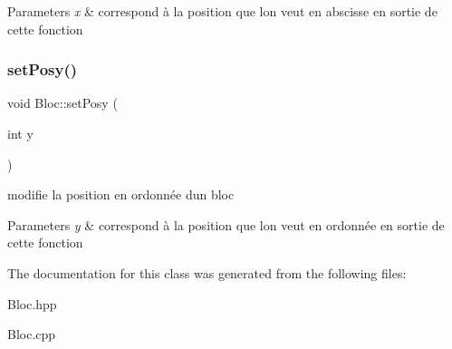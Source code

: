 \begin{DoxyParams}{Parameters}
{\em x} & correspond à la position que l\textquotesingle{}on veut en abscisse en sortie de cette fonction \\
\hline
\end{DoxyParams}
\mbox{\label{classBloc_a361647f817b1f6202ee29c77e8f03f79}} 
\subsubsection{\texorpdfstring{set\+Posy()}{setPosy()}}
{\footnotesize\ttfamily void Bloc\+::set\+Posy (\begin{DoxyParamCaption}\item[{int}]{y }\end{DoxyParamCaption})}



modifie la position en ordonnée d\textquotesingle{}un bloc 


\begin{DoxyParams}{Parameters}
{\em y} & correspond à la position que l\textquotesingle{}on veut en ordonnée en sortie de cette fonction \\
\hline
\end{DoxyParams}


The documentation for this class was generated from the following files\+:\begin{DoxyCompactItemize}
\item 
Bloc.\+hpp\item 
Bloc.\+cpp\end{DoxyCompactItemize}
